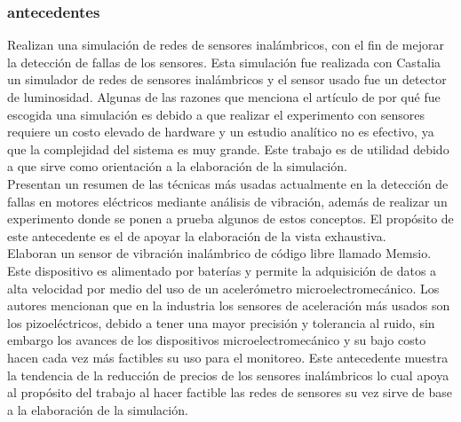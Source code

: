 
\subsubsection{antecedentes}

\textcite{Pinto} Realizan una simulación de redes de sensores inalámbricos, con el fin de mejorar la detección de fallas de los sensores. Esta simulación fue realizada con Castalia un simulador de redes de sensores inalámbricos y el sensor usado fue un detector de luminosidad. Algunas de las razones que menciona el artículo de por qué fue escogida una simulación es debido a que realizar el experimento con sensores requiere un costo elevado de hardware y un estudio analítico no es efectivo, ya que la complejidad del sistema es muy grande. Este trabajo es de utilidad debido a que sirve como orientación a la elaboración de la simulación.\\


\textcite{Ugwiri} Presentan un resumen de las técnicas más usadas actualmente en la detección de fallas en motores eléctricos mediante análisis de vibración, además de realizar un experimento donde se ponen a prueba algunos de estos conceptos. El propósito de este antecedente es el de apoyar la elaboración de la vista exhaustiva.\\


\textcite{Koene} Elaboran un sensor de vibración inalámbrico de código libre llamado Memsio. Este dispositivo es alimentado por baterías y permite la adquisición de datos a alta velocidad por medio del uso de un acelerómetro microelectromecánico. Los autores mencionan que en la industria los sensores de aceleración más usados son los pizoeléctricos, debido a tener una mayor precisión y tolerancia al ruido, sin embargo los avances de los dispositivos microelectromecánico y su bajo costo hacen cada vez más factibles su uso para el monitoreo. Este antecedente muestra la tendencia de la reducción de precios de los sensores inalámbricos lo cual apoya al propósito del trabajo al hacer factible las redes de sensores su vez sirve de base a la elaboración de la simulación.
